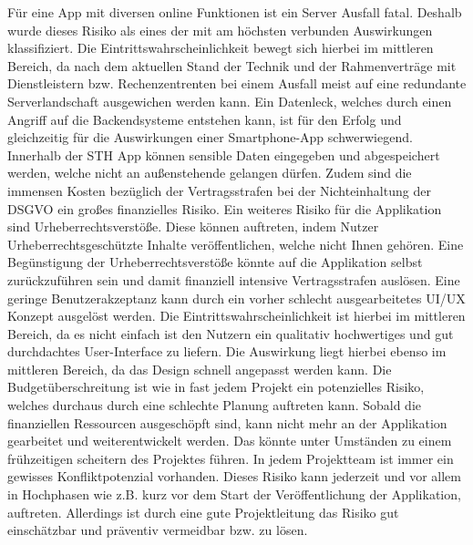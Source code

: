 Für eine App mit diversen online Funktionen ist ein Server Ausfall fatal. Deshalb wurde dieses Risiko als eines der mit am höchsten verbunden Auswirkungen klassifiziert. Die Eintrittswahrscheinlichkeit bewegt sich hierbei im mittleren Bereich, da nach dem aktuellen Stand der Technik und der Rahmenverträge mit Dienstleistern bzw. Rechenzentrenten bei einem Ausfall meist auf eine redundante Serverlandschaft ausgewichen werden kann. Ein Datenleck, welches durch einen Angriff auf die Backendsysteme entstehen kann, ist für den Erfolg und gleichzeitig für die Auswirkungen einer Smartphone-App schwerwiegend. Innerhalb der STH App können sensible Daten eingegeben und abgespeichert werden, welche nicht an außenstehende gelangen dürfen. Zudem sind die immensen Kosten bezüglich der Vertragsstrafen bei der Nichteinhaltung der DSGVO ein großes finanzielles Risiko. Ein weiteres Risiko für die Applikation sind Urheberrechtsverstöße. Diese können auftreten, indem Nutzer Urheberrechtsgeschützte Inhalte veröffentlichen, welche nicht Ihnen gehören. Eine Begünstigung der Urheberrechtsverstöße könnte auf die Applikation selbst zurückzuführen sein und damit finanziell intensive Vertragsstrafen auslösen. Eine geringe Benutzerakzeptanz kann durch ein vorher schlecht ausgearbeitetes UI/UX Konzept ausgelöst werden. Die Eintrittswahrscheinlichkeit ist hierbei im mittleren Bereich, da es nicht einfach ist den Nutzern ein qualitativ hochwertiges und gut durchdachtes User-Interface zu liefern. Die Auswirkung liegt hierbei ebenso im mittleren Bereich, da das Design schnell angepasst werden kann. Die Budgetüberschreitung ist wie in fast jedem Projekt ein potenzielles Risiko, welches durchaus durch eine schlechte Planung auftreten kann. Sobald die finanziellen Ressourcen ausgeschöpft sind, kann nicht mehr an der Applikation gearbeitet und weiterentwickelt werden. Das könnte unter Umständen zu einem frühzeitigen scheitern des Projektes führen. In jedem Projektteam ist immer ein gewisses Konfliktpotenzial vorhanden. Dieses Risiko kann jederzeit und vor allem in Hochphasen wie z.B. kurz vor dem Start der Veröffentlichung der Applikation, auftreten. Allerdings ist durch eine gute Projektleitung das Risiko gut einschätzbar und präventiv vermeidbar bzw. zu lösen.


